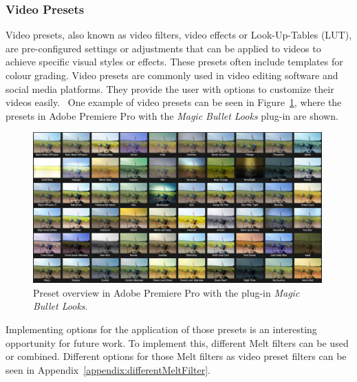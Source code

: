 \documentclass[../MasterThesis.tex]{subfiles}
\begin{document}
\subsubsection*{Video Presets}

Video presets, also known as video filters, video effects or Look-Up-Tables (LUT), are pre-configured settings or adjustments that can be applied to videos to achieve specific visual styles or effects. 
These presets often include templates for colour grading. 
Video presets are commonly used in video editing software and social media platforms. They provide the user with options to customize their videos easily.~\cite{cc1}
%
One example of video presets can be seen in Figure~\ref{figure:app}, where the presets in Adobe Premiere Pro with the \textit{Magic Bullet Looks} plug-in are shown.~\cite{premierepro, magicbullet}

\begin{figure}[H]
	
	\centering
	
	\includegraphics[width=0.99\textwidth]{app.png}
	
	\caption[Presets in Adobe Premiere Pro (\textit{Magic Bullet Looks}).]{Preset overview in Adobe Premiere Pro with the plug-in \textit{Magic Bullet Looks}.~\cite{premierepro, magicbullet}}
	\label{figure:app}
	
\end{figure}

Implementing options for the application of those presets is an interesting opportunity for future work. To implement this, different Melt filters can be used or combined. Different options for those Melt filters as video preset filters can be seen in Appendix~\ref{appendix:differentMeltFilter}.
\end{document}
